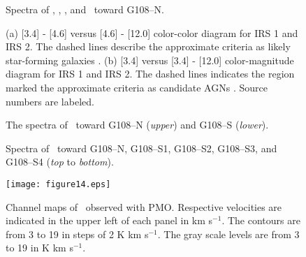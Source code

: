 \documentclass[manuscript]{aastex}
\begin{document}
\begin{figure}[!p]
\begin{center}
\caption{Spectra of \hcop, \hcn, \hcopf, and \nht\ toward G108--N. }
\end{center}
\end{figure}



\begin{figure}[!p]
\begin{center}
\caption{(a) [3.4] - [4.6] versus [4.6] - [12.0] color-color diagram for IRS 1 and IRS 2.
The dashed lines describe the approximate criteria as likely star-forming galaxies \citep{koenig14}.
(b) [3.4] versus [3.4] - [12.0] color-magnitude diagram for IRS 1 and IRS 2.
The dashed lines indicates the region marked the approximate criteria as candidate AGNs \citep{koenig14}.
Source numbers are labeled.}
\end{center}
\end{figure}

\begin{figure}[!p]
\begin{center}
\caption{The spectra of \nhp\ toward G108--N (\textit{upper}) and G108--S (\textit{lower}).}
\end{center}
\end{figure}
\clearpage

\begin{figure}[!p]
\begin{center}
\caption{Spectra of \hcn\ toward G108--N, G108--S1, G108--S2, G108--S3, and G108--S4 (\textit{top} to \textit{bottom}). }
\end{center}
\end{figure}

\begin{figure}[tbh!]
\centering
\texttt{[image: figure14.eps]}
\caption{Channel maps of \tco\ observed with PMO. Respective velocities are indicated in the upper left of each panel in km s$^{-1}$. 
The contours are from 3 to 19 in steps of 2 K km s$^{-1}$. 
The gray scale levels are from 3 to 19 in K km s$^{-1}$.}
\end{figure}



\clearpage
\end{document}

